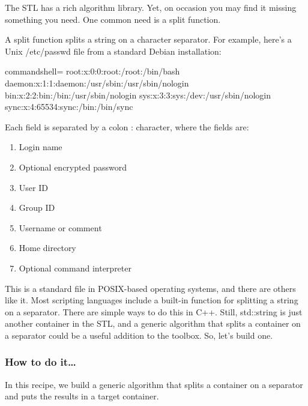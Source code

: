 
The STL has a rich algorithm library. Yet, on occasion you may find it missing something you need. One common need is a split function.

A split function splits a string on a character separator. For example, here's a Unix /etc/passwd file from a standard Debian installation:

\begin{tcblisting}{commandshell={}}
root:x:0:0:root:/root:/bin/bash
daemon:x:1:1:daemon:/usr/sbin:/usr/sbin/nologin
bin:x:2:2:bin:/bin:/usr/sbin/nologin
sys:x:3:3:sys:/dev:/usr/sbin/nologin
sync:x:4:65534:sync:/bin:/bin/sync
\end{tcblisting}

Each field is separated by a colon : character, where the fields are:


\begin{enumerate}
\item 
Login name

\item 
Optional encrypted password

\item 
User ID

\item 
Group ID

\item 
Username or comment

\item 
Home directory

\item 
Optional command interpreter
\end{enumerate}

This is a standard file in POSIX-based operating systems, and there are others like it. Most scripting languages include a built-in function for splitting a string on a separator. There are simple ways to do this in C++. Still, std::string is just another container in the STL, and a generic algorithm that splits a container on a separator could be a useful addition to the toolbox. So, let's build one.

\subsubsection{How to do it…}

In this recipe, we build a generic algorithm that splits a container on a separator and puts the results in a target container.

